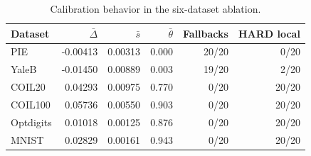 \begin{table}[t]
\centering
\caption{Calibration behavior in the six-dataset ablation.}\label{tab:ablation6_calibration}
\small
\begin{tabular}{lrrrrr}
\toprule
Dataset & $\bar\Delta$ & $\bar s$ & $\bar\theta$ & Fallbacks & HARD local \\
\midrule
PIE & -0.00413 & 0.00313 & 0.000 & 20/20 & 0/20 \\
YaleB & -0.01450 & 0.00889 & 0.003 & 19/20 & 2/20 \\
COIL20 & 0.04293 & 0.00975 & 0.770 & 0/20 & 20/20 \\
COIL100 & 0.05736 & 0.00550 & 0.903 & 0/20 & 20/20 \\
Optdigits & 0.01018 & 0.00125 & 0.876 & 0/20 & 20/20 \\
MNIST & 0.02829 & 0.00161 & 0.943 & 0/20 & 20/20 \\
\bottomrule
\end{tabular}
\end{table}
